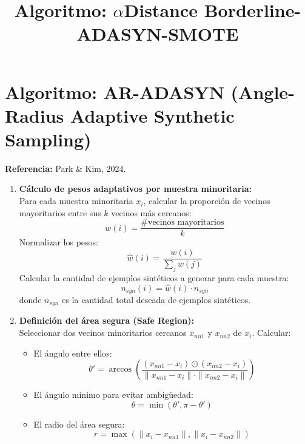 \documentclass[12pt]{article}
\title{Algoritmo: $\alpha$Distance Borderline-ADASYN-SMOTE}
\date{}
\begin{document}
\maketitle

\section*{Algoritmo: AR-ADASYN (Angle-Radius Adaptive Synthetic Sampling)}

\textbf{Referencia:} Park \& Kim, 2024.

\begin{enumerate}[label=\textbf{\arabic*.}]
    \item \textbf{Cálculo de pesos adaptativos por muestra minoritaria:}\\
    Para cada muestra minoritaria $x_i$, calcular la proporción de vecinos mayoritarios entre sus $k$ vecinos más cercanos:
    \[
    w(i) = \frac{\text{\# vecinos mayoritarios}}{k}
    \]
    Normalizar los pesos:
    \[
    \hat{w}(i) = \frac{w(i)}{\sum_j w(j)}
    \]
    Calcular la cantidad de ejemplos sintéticos a generar para cada muestra:
    \[
    n_{syn}(i) = \hat{w}(i) \cdot n_{syn}
    \]
    donde $n_{syn}$ es la cantidad total deseada de ejemplos sintéticos.

    \item \textbf{Definición del área segura (Safe Region):}\\
    Seleccionar dos vecinos minoritarios cercanos $x_{nn1}$ y $x_{nn2}$ de $x_i$. Calcular:

    \begin{itemize}
        \item El ángulo entre ellos:
        \[
        \theta' = \arccos \left( \frac{(x_{nn1} - x_i) \odot (x_{nn2} - x_i)}{\|x_{nn1} - x_i\| \cdot \|x_{nn2} - x_i\|} \right)
        \]
        \item El ángulo mínimo para evitar ambigüedad:
        \[
        \theta = \min(\theta', \pi - \theta')
        \]
        \item El radio del área segura:
        \[
        r = \max(\|x_i - x_{nn1}\|, \|x_i - x_{nn2}\|)
        \]
    \end{itemize}


\end{enumerate}
\end{document}
